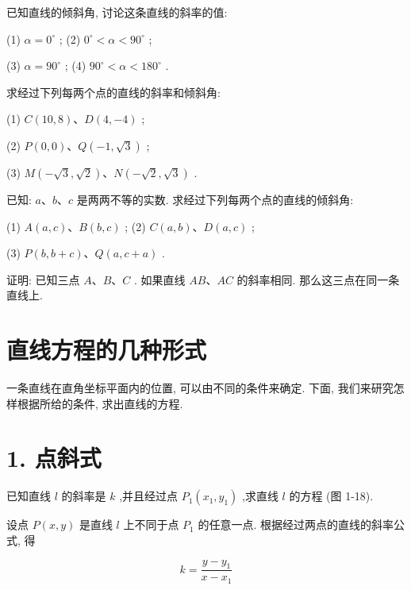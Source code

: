 \documentclass[lang=cn,newtx,10.5pt,scheme=chinese]{elegantbook}
\begin{document}
\begin{problemset}[练习]

\item 已知直线的倾斜角, 讨论这条直线的斜率的值:

(1) \(\alpha = {0}^{ \circ }\) ; (2) \({0}^{ \circ } < \alpha < {90}^{ \circ }\) ;

(3) \(\alpha = {90}^{ \circ }\) ; (4) \({90}^{ \circ } < \alpha < {180}^{ \circ }\) .

\item 求经过下列每两个点的直线的斜率和倾斜角:

(1) \(C\left( {{10},8}\right) \text{、}D\left( {4, - 4}\right)\) ;

(2) \(P\left( {0,0}\right) \text{、}Q\left( {-1,\sqrt{3}}\right)\) ;

(3) \(M\left( {-\sqrt{3},\sqrt{2}}\right) \text{、}N\left( {-\sqrt{2},\sqrt{3}}\right)\) .

\item 已知: \(a\text{、}b\text{、}c\) 是两两不等的实数. 求经过下列每两个点的直线的倾斜角:

(1) \(A\left( {a,c}\right) \text{、}B\left( {b,c}\right)\) ; (2) \(C\left( {a,b}\right) \text{、}D\left( {a,c}\right)\) ;

(3) \(P\left( {b,b + c}\right) \text{、}Q\left( {a,c + a}\right)\) .

\item 证明: 已知三点 \(A\text{、}B\text{、}C\) . 如果直线 \({AB}\text{、}{AC}\) 的斜率相同. 那么这三点在同一条直线上.
\end{problemset}

\section{直线方程的几种形式}

一条直线在直角坐标平面内的位置, 可以由不同的条件来确定. 下面, 我们来研究怎样根据所给的条件, 求出直线的方程.

\section*{1. 点斜式}

已知直线 \(l\) 的斜率是 \(k\) ,并且经过点 \({P}_{1}\left( {{x}_{1},{y}_{1}}\right)\) ,求直线 \(l\) 的方程 (图 1-18).

设点 \(P\left( {x,y}\right)\) 是直线 \(l\) 上不同于点 \({P}_{1}\) 的任意一点. 根据经过两点的直线的斜率公式, 得

\[
  k = \frac{y - {y}_{1}}{x - {x}_{1}}
\]
\end{document}
